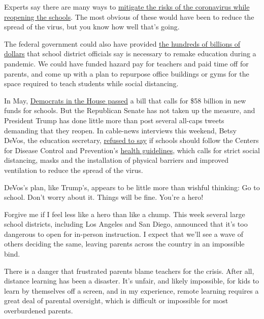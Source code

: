 Experts say there are many ways to
\href{https://www.nytimes3xbfgragh.onion/2020/07/10/opinion/coronavirus-schools-reopening.html}{mitigate
the risks of the coronavirus while reopening the schools}. The most
obvious of these would have been to reduce the spread of the virus, but
you know how well that's going.

The federal government could also have provided
\href{https://ccsso.org/blog/ccsso-submits-cost-estimate-safely-reopening-public-schools-after-covid}{the
hundreds of billions of dollars} that school district officials say is
necessary to remake education during a pandemic. We could have funded
hazard pay for teachers and paid time off for parents, and come up with
a plan to repurpose office buildings or gyms for the space required to
teach students while social distancing.

In May,
\href{https://blogs.edweek.org/edweek/campaign-k-12/2020/05/covid-relief-schools-60-billion-democrats-bill.html}{Democrats
in the House passed} a bill that calls for \$58 billion in new funds for
schools. But the Republican Senate has not taken up the measure, and
President Trump has done little more than post several all-caps tweets
demanding that they reopen. In cable-news interviews this weekend, Betsy
DeVos, the education secretary,
\href{https://www.cnn.com/2020/07/12/politics/betsy-devos-schools-reopening-coronavirus-cnntv/index.html}{refused
to say} if schools should follow the Centers for Disease Control and
Prevention's
\href{https://www.cdc.gov/coronavirus/2019-ncov/community/schools-childcare/schools.html}{health
guidelines}, which calls for strict social distancing, masks and the
installation of physical barriers and improved ventilation to reduce the
spread of the virus.

DeVos's plan, like Trump's, appears to be little more than wishful
thinking: Go to school. Don't worry about it. Things will be fine.
You're a hero!

Forgive me if I feel less like a hero than like a chump. This week
several large school districts, including Los Angeles and San Diego,
announced that it's too dangerous to open for in-person instruction. I
expect that we'll see a wave of others deciding the same, leaving
parents across the country in an impossible bind.

There is a danger that frustrated parents blame teachers for the crisis.
After all, distance learning has been a disaster. It's unfair, and
likely impossible, for kids to learn by themselves off a screen, and in
my experience, remote learning requires a great deal of parental
oversight, which is difficult or impossible for most overburdened
parents.

